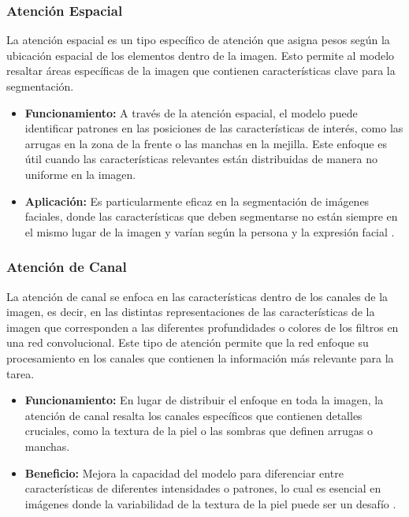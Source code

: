 \subsubsection{Atención Espacial}  
La atención espacial es un tipo específico de atención que asigna pesos según la ubicación espacial de los elementos dentro de la imagen. Esto permite al modelo resaltar áreas específicas de la imagen que contienen características clave para la segmentación.  
\begin{itemize}
    \item \textbf{Funcionamiento:} A través de la atención espacial, el modelo puede identificar patrones en las posiciones de las características de interés, como las arrugas en la zona de la frente o las manchas en la mejilla. Este enfoque es útil cuando las características relevantes están distribuidas de manera no uniforme en la imagen.
    \item \textbf{Aplicación:} Es particularmente eficaz en la segmentación de imágenes faciales, donde las características que deben segmentarse no están siempre en el mismo lugar de la imagen y varían según la persona y la expresión facial \parencite{autor2020spa}.
\end{itemize}

\subsubsection{Atención de Canal}  
La atención de canal se enfoca en las características dentro de los canales de la imagen, es decir, en las distintas representaciones de las características de la imagen que corresponden a las diferentes profundidades o colores de los filtros en una red convolucional. Este tipo de atención permite que la red enfoque su procesamiento en los canales que contienen la información más relevante para la tarea.  
\begin{itemize}
    \item \textbf{Funcionamiento:} En lugar de distribuir el enfoque en toda la imagen, la atención de canal resalta los canales específicos que contienen detalles cruciales, como la textura de la piel o las sombras que definen arrugas o manchas.
    \item \textbf{Beneficio:} Mejora la capacidad del modelo para diferenciar entre características de diferentes intensidades o patrones, lo cual es esencial en imágenes donde la variabilidad de la textura de la piel puede ser un desafío \parencite{autor2019canal}.
\end{itemize}

